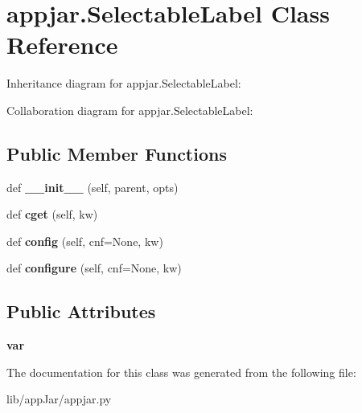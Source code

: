 \hypertarget{classappjar_1_1_selectable_label}{}\section{appjar.\+Selectable\+Label Class Reference}
\label{classappjar_1_1_selectable_label}


Inheritance diagram for appjar.\+Selectable\+Label\+:


Collaboration diagram for appjar.\+Selectable\+Label\+:
\subsection*{Public Member Functions}
\begin{DoxyCompactItemize}
\item 
\mbox{\label{classappjar_1_1_selectable_label_aaf5f1da06fa9e85696c312aefc2054aa}} 
def {\bfseries \+\_\+\+\_\+init\+\_\+\+\_\+} (self, parent, opts)
\item 
\mbox{\label{classappjar_1_1_selectable_label_aee0a34c637cc52031735cf7d7b709d8d}} 
def {\bfseries cget} (self, kw)
\item 
\mbox{\label{classappjar_1_1_selectable_label_a322e279d2b6dcd7aedd43bcab716d9df}} 
def {\bfseries config} (self, cnf=None, kw)
\item 
\mbox{\label{classappjar_1_1_selectable_label_a73830b0c3123002849054c31d9a24d15}} 
def {\bfseries configure} (self, cnf=None, kw)
\end{DoxyCompactItemize}
\subsection*{Public Attributes}
\begin{DoxyCompactItemize}
\item 
\mbox{\label{classappjar_1_1_selectable_label_a7350c2e276aebac8e330031c4169fa2e}} 
{\bfseries var}
\end{DoxyCompactItemize}


The documentation for this class was generated from the following file\+:\begin{DoxyCompactItemize}
\item 
lib/app\+Jar/appjar.\+py\end{DoxyCompactItemize}
